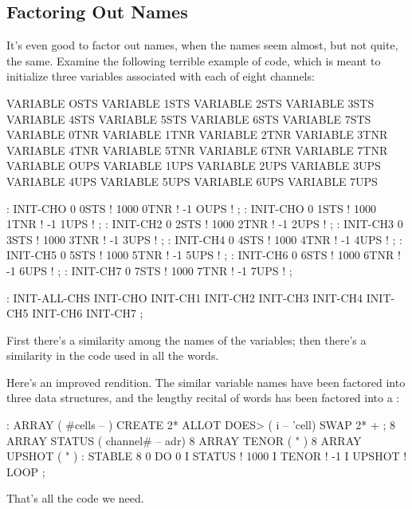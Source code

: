 \subsection{Factoring Out Names}
It's even good to factor out names, when the names seem almost, but
not quite, the same. Examine the following terrible example of code,
which is meant to initialize three variables associated with each of
eight channels:

\begin{Code}
VARIABLE OSTS       VARIABLE 1STS       VARIABLE 2STS 
VARIABLE 3STS       VARIABLE 4STS       VARIABLE 5STS
VARIABLE 6STS       VARIABLE 7STS       VARIABLE 0TNR
VARIABLE 1TNR       VARIABLE 2TNR       VARIABLE 3TNR
VARIABLE 4TNR       VARIABLE 5TNR       VARIABLE 6TNR
VARIABLE 7TNR       VARIABLE OUPS       VARIABLE 1UPS
VARIABLE 2UPS       VARIABLE 3UPS       VARIABLE 4UPS
VARIABLE 5UPS       VARIABLE 6UPS       VARIABLE 7UPS
\end{Code}

\begin{Code} 
: INIT-CHO   0 0STS !  1000 0TNR !  -1 OUPS ! ; 
: INIT-CHO   0 1STS !  1000 1TNR !  -1 1UPS ! ; 
: INIT-CH2   0 2STS !  1000 2TNR !  -1 2UPS ! ; 
: INIT-CH3   0 3STS !  1000 3TNR !  -1 3UPS ! ; 
: INIT-CH4   0 4STS !  1000 4TNR !  -1 4UPS ! ; 
: INIT-CH5   0 5STS !  1000 5TNR !  -1 5UPS ! ; 
: INIT-CH6   0 6STS !  1000 6TNR !  -1 6UPS ! ; 
: INIT-CH7   0 7STS !  1000 7TNR !  -1 7UPS ! ; 
\end{Code}

\begin{Code} 
: INIT-ALL-CHS    INIT-CHO  INIT-CH1  INIT-CH2  INIT-CH3
   INIT-CH4  INIT-CH5  INIT-CH6  INIT-CH7 ;
\end{Code}
First there's a similarity among the names of the variables; then
there's a similarity in the code used in all the 
words.

Here's an improved rendition. The similar variable names have been
factored into three data structures, and the lengthy recital of
 words has been factored into a :

\begin{Code}
: ARRAY  ( #cells -- )  CREATE  2* ALLOT
   DOES> ( i -- 'cell)  SWAP  2* + ; 
8 ARRAY STATUS  ( channel# -- adr)
8 ARRAY TENOR   (        "       )
8 ARRAY UPSHOT  (        "       )
: STABLE   8 0 DO  0 I STATUS !  1000 I TENOR ! 
   -1 I UPSHOT !  LOOP ;
\end{Code}
That's all the code we need.

